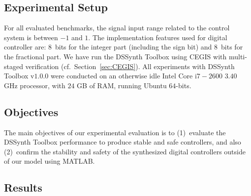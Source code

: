 \documentclass[10pt,conference]{IEEEtran}
\newcommand\tool{{DSSynth Toolbox}\xspace}
\begin{document}

\subsection{Experimental Setup}
\label{experimental-setup}

For all evaluated benchmarks, the signal input range related to the control
system is between $-1$ and $1$.  The implementation features used for
digital controller are: $8$~bits for the integer part (including the sign
bit) and $8$~bits for the fractional part.  We have run the \tool using
CEGIS with multi-staged verification (cf.~Section~\ref{sec:CEGIS}).  All
experiments with \tool v$1$.$0$.$0$ were conducted on an otherwise idle
Intel Core i$7-2600$ $3.40$ GHz processor, with $24$ GB of RAM, running
Ubuntu $64$-bits.

\subsection{Objectives}

The main objectives of our experimental evaluation is to (1)~evaluate the
\tool performance to produce stable and safe controllers, and also
(2)~confirm the stability and safety of the synthesized digital controllers
outside of our model using MATLAB.


\subsection{Results}
\end{document}
